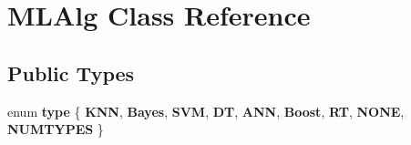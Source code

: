 \hypertarget{class_m_l_alg}{\section{\-M\-L\-Alg \-Class \-Reference}
\label{class_m_l_alg}
}
\subsection*{\-Public \-Types}
\begin{DoxyCompactItemize}
\item 
enum {\bfseries type} \{ \*
{\bfseries \-K\-N\-N}, 
{\bfseries \-Bayes}, 
{\bfseries \-S\-V\-M}, 
{\bfseries \-D\-T}, 
\*
{\bfseries \-A\-N\-N}, 
{\bfseries \-Boost}, 
{\bfseries \-R\-T}, 
{\bfseries \-N\-O\-N\-E}, 
\*
{\bfseries \-N\-U\-M\-T\-Y\-P\-E\-S}
 \}
\end{DoxyCompactItemize}
